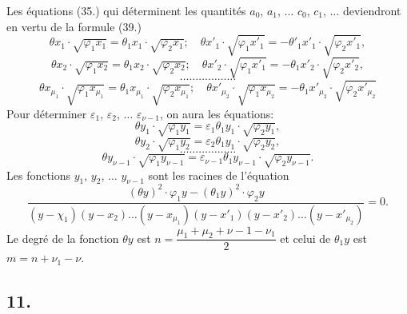 \documentclass{article}
\begin{document}
Les équations (35.) qui déterminent les quantités $a_0$, $a_1$, $\ldots$ $c_0$, $c_1$, $\ldots$ deviendront en vertu de la formule (39.)
\[ \theta x_1 \cdot \sqrt{\varphi_1 x_1} = \theta_1 x_1 \cdot \sqrt{\varphi_2 x_1}; \quad \theta x'_1 \cdot \sqrt{\varphi_1 x'_1} = -\theta'_1 x'_1 \cdot \sqrt{\varphi_2 x'_1}, \tag{40} \]
\[ \theta x_2 \cdot \sqrt{\varphi_1 x_2} = \theta_1 x_2 \cdot \sqrt{\varphi_2 x_2}; \quad \theta x'_2 \cdot \sqrt{\varphi_1 x'_1} = -\theta_1 x'_2 \cdot \sqrt{\varphi_2 x'_2}, \]
\[ \ldots\ldots\ldots\ldots\ldots\ldots \]
\[ \theta x_{\mu_1} \cdot \sqrt{\varphi_1 x_{\mu_1}} = \theta_1 x_{\mu_1} \cdot \sqrt{\varphi_2 x_{\mu_1}}; \quad \theta x'_{\mu_2} \cdot \sqrt{\varphi_1 x_{\mu_2}} = -\theta_1 x'_{\mu_2} \cdot \sqrt{\varphi_2 x'_{\mu_2}} \]
Pour déterminer $\varepsilon_1$, $\varepsilon_2$, $\ldots$ $\varepsilon_{\nu-1}$, on aura les équations:
\[ \theta y_1 \cdot \sqrt{\varphi_1 y_1} = \varepsilon_1\theta_1 y_1 \cdot \sqrt{\varphi_2 y_1}, \tag{41} \]
\[ \theta y_2 \cdot \sqrt{\varphi_1 y_2} = \varepsilon_2\theta_1 y_1 \cdot \sqrt{\varphi_2 y_2}, \]
\[ \ldots\ldots\ldots\ldots\ldots\ldots \]
\[ \theta y_{\nu-1} \cdot \sqrt{\varphi_1 y_{\nu-1}} = \varepsilon_{\nu-1}\theta_1 y_{\nu-1} \cdot \sqrt{\varphi_2 y_{\nu-1}}. \]
Les fonctions $y_1$, $y_2$, $\ldots$ $y_{\nu-1}$ sont les racines de l'équation
\[ \frac{(\theta y)^{2} \cdot \varphi_1 y-(\theta_1 y)^{2} \cdot \varphi_2 y}{(y-\chi_1)(y-x_2)\ldots(y-x_{\mu_1})(y-x'_1)(y-x'_2)\ldots(y-x'_{\mu_2})} = 0. \tag{42} \]
Le degré de la fonction $\theta y$ est $n = \dfrac{\mu_1+\mu_2+\nu-1-\nu_1}{2}$ et celui de $\theta_1 y$ est $m = n+\nu_1-\nu$.
\subsection*{11.}
\end{document}
